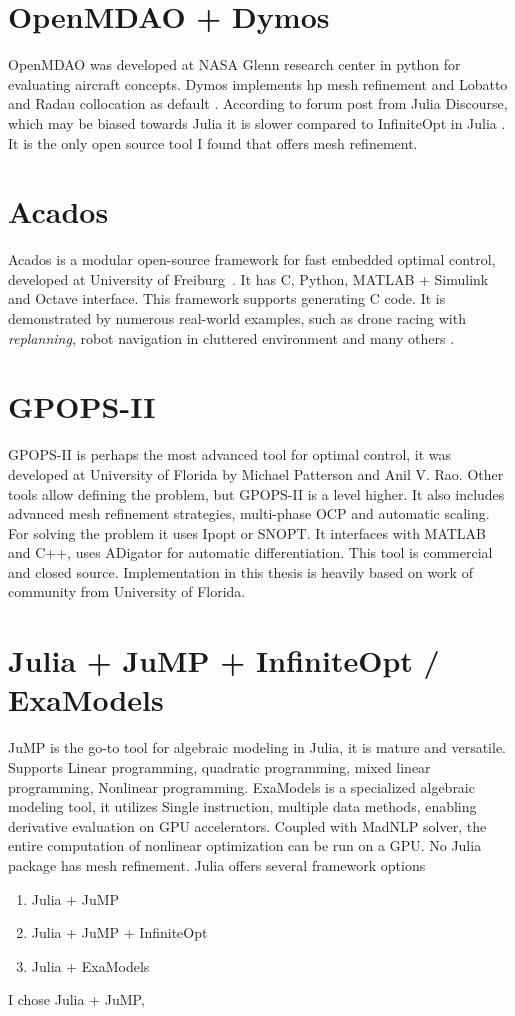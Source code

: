 \section{OpenMDAO + Dymos}
OpenMDAO \cite{Gray2019a} was developed at NASA
Glenn research center in python for evaluating aircraft concepts. Dymos implements hp mesh refinement and Lobatto and Radau collocation as default \cite{Falck2021}. According to forum post from Julia
Discourse, which may be biased towards Julia it is slower compared to InfiniteOpt
in Julia \cite{DoesAnybodyKnow2024}. It is the only open source tool I found that offers mesh refinement.
\section{Acados}
Acados is a modular open-source framework for fast embedded optimal control, developed at University of Freiburg~\cite{Verschueren2021}. It has C, Python, MATLAB + Simulink and Octave interface. This framework supports generating C code. It is demonstrated by numerous real-world examples, such as drone racing with \emph{replanning}, robot navigation in cluttered environment and many others \cite{acados_real_world_examples}.

\section{GPOPS-II}
GPOPS-II \cite{pattersonGPOPSIIMATLABSoftware2014} is perhaps the most advanced
tool for optimal control, it was developed at University of Florida by Michael
Patterson and Anil V. Rao. Other tools allow defining the problem, but
GPOPS-II is a level higher. It also includes advanced mesh refinement
strategies, multi-phase OCP and automatic scaling. For solving the problem
it uses Ipopt or SNOPT. It interfaces with MATLAB and C++, uses ADigator
\cite{weinstein2017algorithm} for automatic differentiation. This tool is
commercial and closed source. Implementation in this thesis is heavily based on
work of community from University of Florida.
\section{Julia + JuMP + InfiniteOpt / ExaModels}
JuMP is the go-to tool for algebraic modeling in Julia, it is mature and
versatile. Supports Linear programming, quadratic programming, mixed linear
programming, Nonlinear programming. ExaModels \cite{shin2023accelerating} is a
specialized algebraic modeling tool, it utilizes Single instruction, multiple
data methods, enabling derivative evaluation on GPU accelerators. Coupled with
MadNLP solver, the entire computation of nonlinear optimization can be run on a
GPU. No Julia package has mesh refinement. Julia offers several framework options
\begin{enumerate}
  \item Julia + JuMP
  \item Julia + JuMP + InfiniteOpt
  \item Julia + ExaModels
\end{enumerate}
I chose Julia + JuMP,


